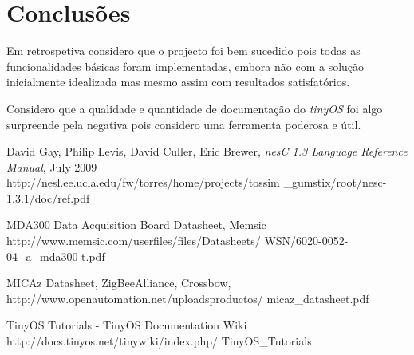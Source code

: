 \documentclass[times,10pt,twocolumn]{article}
\begin{document}
\section{Conclusões}

Em retrospetiva considero que o projecto foi bem sucedido pois todas as funcionalidades básicas foram implementadas, embora não com a solução inicialmente idealizada mas mesmo assim com resultados satisfatórios.

Considero que a qualidade e quantidade de documentação do \emph{tinyOS} foi algo surpreende pela negativa pois considero uma ferramenta poderosa e útil.

\begin{thebibliography}{99}  

David Gay, Philip Levis, David Culler, Eric Brewer, \textit{nesC 1.3 Language Reference Manual}, July 2009
\\http://nesl.ee.ucla.edu/fw/torres/home/projects/tossim
\_gumstix/root/nesc-1.3.1/doc/ref.pdf

MDA300 Data Acquisition Board Datasheet, Memsic
\\http://www.memsic.com/userfiles/files/Datasheets/
WSN/6020-0052-04\_a\_mda300-t.pdf

MICAz Datasheet, ZigBee\texttrademark Alliance, Crossbow,
\\http://www.openautomation.net/uploadsproductos/
micaz\_datasheet.pdf

TinyOS Tutorials - TinyOS Documentation Wiki
\\http://docs.tinyos.net/tinywiki/index.php/
TinyOS\_Tutorials


\end{thebibliography}
\end{document}
